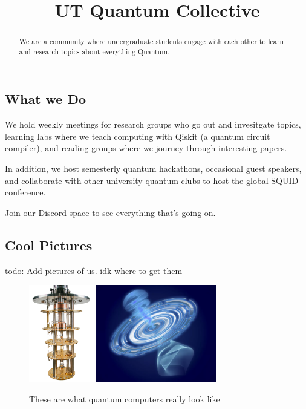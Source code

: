 \documentclass{article}
\title{UT Quantum Collective}
\begin{document}
\maketitle{}

\tableofcontents

\begin{abstract}
	We are a community where undergraduate students engage with each other to learn and research topics about everything Quantum.
\end{abstract}

\subsection{What we Do}
	We hold weekly meetings for research groups who go out and invesitgate topics, learning labs where we teach computing with Qiskit (a quantum circuit compiler), and reading groups where we journey through interesting papers.

	In addition, we host semesterly quantum hackathons, occasional guest speakers, and collaborate with other university quantum clubs to host the global SQUID conference.

	Join \href{https://discord.gg/UBnRaHuzF9}{our Discord space} to see everything that's going on.

	\subsection{Cool Pictures}

	todo: Add pictures of us. idk where to get them

	\begin{figure}[h!]
		\includegraphics[height=160px]{dilutionfridge.png}
		\includegraphics[height=160px]{real_qubit.png}
		\caption{These are what quantum computers really look like}
	\end{figure}
\end{document}
